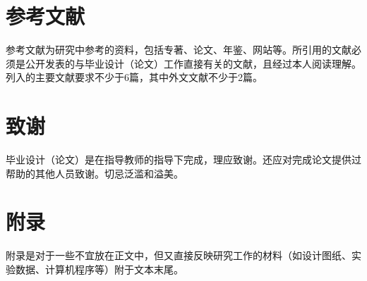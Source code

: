 \section{参考文献}
\par 参考文献为研究中参考的资料，包括专著、论文、年鉴、网站等。所引用的文献必须是公开发表的与毕业设计（论文）工作直接有关的文献，且经过本人阅读理解。列入的主要文献要求不少于6篇，其中外文文献不少于2篇。

\section{致谢}
\par 毕业设计（论文）是在指导教师的指导下完成，理应致谢。还应对完成论文提供过帮助的其他人员致谢。切忌泛滥和溢美。

\section{附录}
\par 附录是对于一些不宜放在正文中，但又直接反映研究工作的材料（如设计图纸、实验数据、计算机程序等）附于文本末尾。

